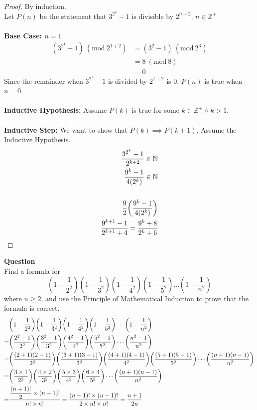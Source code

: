 \documentclass[article,12pt]{article}
\newcounter{question}
\def\questionnum{{\Large\bfseries{Question \arabic{question} }}\\[1em]}
\newcommand{\question}{
    \stepcounter{question}
    \questionnum
}
\DeclarePairedDelimiter\paren{(}{)} %
\newcommand{\df}{\displaystyle\frac} %
\newcommand{\Mod}[1]{\ (\mathrm{mod}\ #1)} %
\newcommand{\ints}{\mathbb{Z}}
\newcommand{\nats}{\mathbb{N}}
\begin{document}
\begin{proof}
    By induction. \\
    Let $P(n)$ be the statement that $3^{2^n} -1$ is divisible by $2^{n+2}$, $n \in \ints^+$ \\ 
    \\
    \textbf{Base Case: $n=1$}
    \begin{align*}
        (3^{2^1} - 1)\Mod{2^{1+2}} &= (3^{2} - 1)\Mod{2^{3}} \\
                                   &= 8\Mod{8} \\
                                   &= 0
    \end{align*}
    Since the remainder when $3^{2^1}-1$ is divided by $2^{1+2}$ is 0, $P(n)$ is true when $n=0$. \\
    \\
    \textbf{Inductive Hypothesis:} Assume $P(k)$ is true for some $k \in \ints^+ \land k > 1$. \\
    \\
    \textbf{Inductive Step:} We want to show that $P(k) \implies P(k+1)$. Assume the Inductive Hypothesis.
    \begin{align*}
        \frac{3^{2^k} - 1}{2^{k+2}} \in \nats \\
        \frac{9^k - 1}{4\paren*{2^k}} \in \nats \\
        \\
        \frac{9}{2}\paren*{\frac{9^k - 1}{4\paren*{2^k}}} \\
        \frac{9^{k+1} - 1}{2^{k+1} + 4} = \frac{9^{k} + 8}{2^{k} + 6}
    \end{align*}
\end{proof}
\newpage
\question
Find a formula for $$(1-\df1{2^2})(1-\df1{3^2})(1-\df1{4^2})(1-\df1{5^2})...(1-\df1{n^2})$$  where $n \geq 2$, and use the Principle of Mathematical Induction to prove that the formula is correct. \\
\begin{align*}
      &\paren*{1-\df1{2^2}}\paren*{1-\df1{3^2}}\paren*{1-\df1{4^2}}\paren*{1-\df1{5^2}}\cdots \paren*{1-\df1{n^2}} \\
    = &\paren*{\frac{2^2-1}{2^2}}\paren*{\frac{3^2-1}{3^2}}\paren*{\frac{4^2-1}{4^2}}\paren*{\frac{5^2-1}{5^2}}\cdots \paren*{\frac{n^2-1}{n^2}} \\
    = &\paren*{\frac{(2+1)(2-1)}{2^2}}\paren*{\frac{(3+1)(3-1)}{3^2}}\paren*{\frac{(4+1)(4-1)}{4^2}}\paren*{\frac{(5+1)(5-1)}{5^2}}\cdots\paren*{\frac{(n+1)(n-1)}{n^2}} \\
    = &\paren*{\frac{3 \times 1}{2^2}}\paren*{\frac{4 \times 2}{3^2}}\paren*{\frac{5 \times 3}{4^2}}\paren*{\frac{6 \times 4}{5^2}}\cdots\paren*{\frac{(n+1)(n-1)}{n^2}} \\
    = &\frac{\df{(n+1)!}{2} \times (n-1)!}{n! \times n!} = \frac{(n+1)! \times (n-1)!}{2 \times n! \times n!} = \frac{n+1}{2n}
\end{align*}
\end{document}
